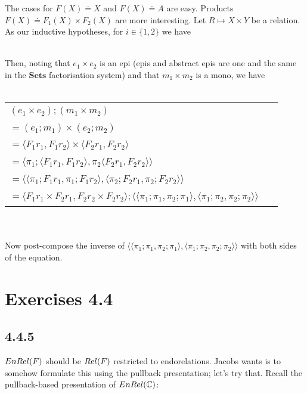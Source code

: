 \documentclass{article}
\newcommand{\mbf}{\mathbf}
\newcommand{\absmono}{\mapsto}
\begin{document}
The cases for $F(X) \doteq X$ and $F(X) \doteq A$ are easy. Products $F(X) \doteq F_1(X) \times F_2(X)$ are 
more interesting. Let $R \absmono X \times Y$ be a relation. As our inductive hypotheses, for $i \in \{1, 2\}$ 
we have~\\
~\\
Then, noting that $e_1 \times e_2$ is an epi (epis and abstract epis are one and the same in the $\mbf{Sets}$ factorisation system) and that $m_1 \times m_2$ is a mono, we have~\\~\\
\begin{tabular}{ll}
$(e_1 \times e_2);(m_1 \times m_2)$ & ~ \\
$= (e_1;m_1) \times (e_2;m_2)$ & ~ \\
$= \langle F_1 r_1 , F_1 r_2 \rangle \times \langle F_2 r_1 , F_2 r_2 \rangle$ & ~ \\
$= \langle \pi_1;\langle F_1 r_1 , F_1 r_2 \rangle , \pi_2 \langle F_2 r_1 , F_2 r_2 \rangle \rangle$ & ~ \\
$= \langle \langle \pi_1 ; F_1 r_1 , \pi_1 ; F_1 r_2 \rangle , \langle \pi_2 ; F_2 r_1 , \pi_2 ; F_2 r_2 \rangle \rangle$ & ~\\
$= \langle F_1 r_1 \times F_2 r_1 , F_2 r_2 \times F_2 r_2 \rangle;\langle \langle \pi_1;\pi_1,\pi_2;\pi_1 \rangle , \langle \pi_1 ; \pi_2 , \pi_2 ; \pi_2 \rangle \rangle$ & ~
\end{tabular}~\\~\\
Now post-compose the inverse of $\langle \langle \pi_1;\pi_1,\pi_2;\pi_1 \rangle , \langle \pi_1 ; \pi_2 , \pi_2 ; \pi_2 \rangle \rangle$ with both sides of the equation.


\section*{Exercises 4.4}

\subsection*{4.4.5}

$\mit{EnRel}(F)$ should be $\mit{Rel}(F)$ restricted to endorelations. Jacobs wants is to
somehow formulate this using the pullback presentation; let's try that.
Recall the pullback-based presentation of $\mit{EnRel}(\mathbb C)$:
\end{document}
